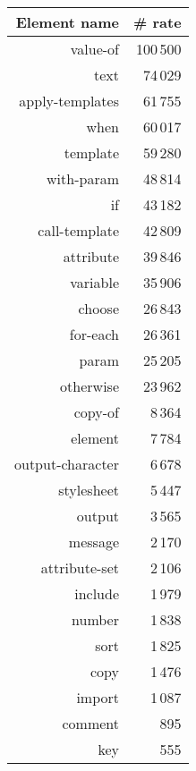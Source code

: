 \begin{tabular}{|r|r|}
\hline
\bf Element name&\bf \# rate\\
\hline
value-of&100\,500\\
\hline
text&74\,029\\
\hline
apply-templates&61\,755\\
\hline
when&60\,017\\
\hline
template&59\,280\\
\hline
with-param&48\,814\\
\hline
if&43\,182\\
\hline
call-template&42\,809\\
\hline
attribute&39\,846\\
\hline
variable&35\,906\\
\hline
choose&26\,843\\
\hline
for-each&26\,361\\
\hline
param&25\,205\\
\hline
otherwise&23\,962\\
\hline
copy-of&8\,364\\
\hline
element&7\,784\\
\hline
output-character&6\,678\\
\hline
stylesheet&5\,447\\
\hline
output&3\,565\\
\hline
message&2\,170\\
\hline
attribute-set&2\,106\\
\hline
include&1\,979\\
\hline
number&1\,838\\
\hline
sort&1\,825\\
\hline
copy&1\,476\\
\hline
import&1\,087\\
\hline
comment&895\\
\hline
key&555\\
\hline
\end{tabular}
